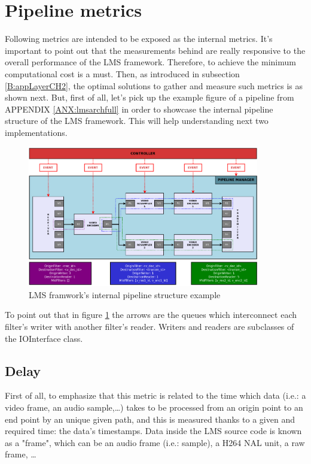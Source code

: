 \section{Pipeline metrics}

Following metrics are intended to be exposed as the internal metrics. It's important to point out that the measurements behind are really responsive to the overall performance of the LMS framework. Therefore, to achieve the minimum computational cost is a must. Then, as introduced in subsection \ref{B:appLayerCH2}, the optimal solutions to gather and measure such metrics is as shown next. But, first of all, let's pick up the example figure of a pipeline from APPENDIX \ref{ANX:lmsarchfull} in order to showcase the internal pipeline structure of the LMS framework. This will help understanding next two implementations.

\begin{figure}[!htb]
\begin{center}
\includegraphics[width=0.9\textwidth]{./images/LMSpipelineBasicOne.png}
\caption{LMS framwork's internal pipeline structure example}
\label{F:lmsps}
\end{center}
\end{figure}

To point out that in figure \ref{F:lmsps} the arrows are the queues which interconnect each filter's writer with another filter's reader. Writers and readers are subclasses of the IOInterface class.

\subsection{Delay}

First of all, to emphasize that this metric is related to the time which data (i.e.: a video frame, an audio sample,\ldots) takes to be processed from an origin point to an end point by an unique given path, and this is measured thanks to a given and required time: the data's timestamps. Data inside the LMS source code is known as a "frame", which can be an audio frame (i.e.: sample), a H264 NAL unit, a raw frame, \ldots 

